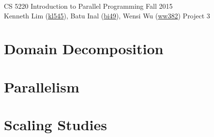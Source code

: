 \documentclass{scrartcl}
\begin{document}
  \begin{framed}
  CS 5220 Introduction to Parallel Programming \hfill Fall 2015 \\
  Kenneth Lim (\href{mailto:kl545@cornell.edu}{kl545}), Batu Inal (\href{mailto:bi49@cornell.edu}{bi49}), Wensi Wu (\href{mailto:ww382@cornell.edu}{ww382}) \hfill Project 3 \hspace{-3ex}
  \end{framed}
  \section{Domain Decomposition}
  \section{Parallelism}
  \section{Scaling Studies}
\end{document}
